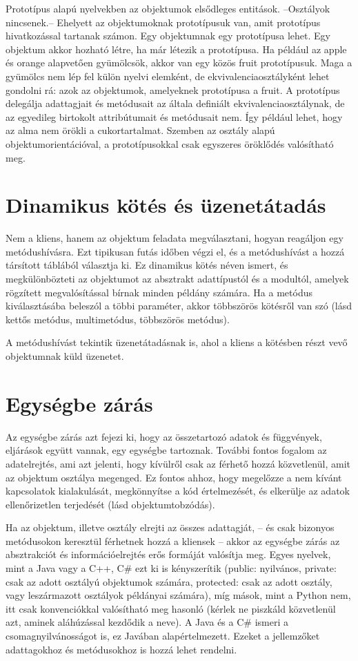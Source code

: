 \documentclass[a4paper,12pt,twoside]{report}
\theoremstyle{definition}
\begin{document}
	Prototípus alapú nyelvekben az objektumok elsődleges entitások. --Osztályok nincsenek.-- Ehelyett az objektumoknak prototípusuk van, amit prototípus hivatkozással tartanak számon. Egy objektumnak egy prototípusa lehet. Egy objektum akkor hozható létre, ha már létezik a prototípusa. Ha például az apple és orange alapvetően gyümölcsök, akkor van egy közös fruit prototípusuk. Maga a gyümölcs nem lép fel külön nyelvi elemként, de ekvivalenciaosztályként lehet gondolni rá: azok az objektumok, amelyeknek prototípusa a fruit. A prototípus delegálja adattagjait és metódusait az általa definiált ekvivalenciaosztálynak, de az egyedileg birtokolt attribútumait és metódusait nem. Így például lehet, hogy az alma nem örökli a cukortartalmat. Szemben az osztály alapú objektumorientációval, a prototípusokkal csak egyszeres öröklődés valósítható meg.
	
	\section{Dinamikus kötés és üzenetátadás}
	Nem a kliens, hanem az objektum feladata megválasztani, hogyan reagáljon egy metódushívásra. Ezt tipikusan futás időben végzi el, és a metódushívást a hozzá társított táblából választja ki. Ez dinamikus kötés néven ismert, és megkülönbözteti az objektumot az absztrakt adattípustól és a modultól, amelyek rögzített megvalósítással bírnak minden példány számára. Ha a metódus kiválasztásába beleszól a többi paraméter, akkor többszörös kötésről van szó (lásd kettős metódus, multimetódus, többszörös metódus).
	
	A metódushívást tekintik üzenetátadásnak is, ahol a kliens a kötésben részt vevő objektumnak küld üzenetet.
	
	\section{Egységbe zárás}
	Az egységbe zárás azt fejezi ki, hogy az összetartozó adatok és függvények, eljárások együtt vannak, egy egységbe tartoznak. További fontos fogalom az adatelrejtés, ami azt jelenti, hogy kívülről csak az férhető hozzá közvetlenül, amit az objektum osztálya megenged. Ez fontos ahhoz, hogy megelőzze a nem kívánt kapcsolatok kialakulását, megkönnyítse a kód értelmezését, és elkerülje az adatok ellenőrizetlen terjedését (lásd objektumtobzódás).
	
	Ha az objektum, illetve osztály elrejti az összes adattagját, -- és csak bizonyos metódusokon keresztül férhetnek hozzá a kliensek -- akkor az egységbe zárás az absztrakciót és információelrejtés erős formáját valósítja meg. Egyes nyelvek, mint a Java vagy a C++, C\# ezt ki is kényszerítik (public: nyilvános, private: csak az adott osztályú objektumok számára, protected: csak az adott osztály, vagy leszármazott osztályok példányai számára), míg mások, mint a Python nem, itt csak konvenciókkal valósítható meg hasonló (kérlek ne piszkáld közvetlenül azt, aminek aláhúzással kezdődik a neve). A Java és a C\# ismeri a csomagnyilvánosságot is, ez Javában alapértelmezett. Ezeket a jellemzőket adattagokhoz és metódusokhoz is hozzá lehet rendelni.
	
\end{document}

